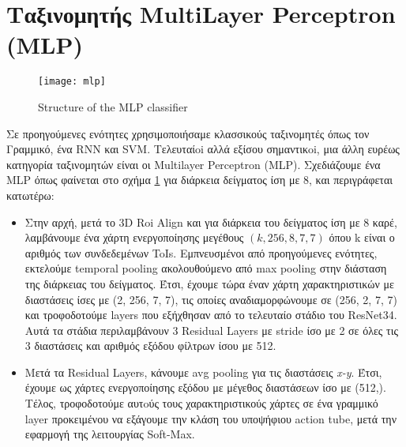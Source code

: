 \section{Ταξινομητής \en MultiLayer Perceptron (MLP)}
\begin{figure}[h]
  \en
  \centering
  \texttt{[image: mlp]}
  \caption{Structure of the MLP classifier}
  \label{fig:gr_mlp_structure}
\end{figure}
\gr
Σε προηγούμενες ενότητες χρησιμοποιήσαμε κλασσικούς ταξινομητές όπως τον Γραμμικό, ένα \en RNN \gr και \en SVM\gr.
Τελευταίoi αλλά εξίσου σημαντικoi, μια άλλη ευρέως κατηγορία ταξινομητών είναι οι \en Multilayer Perceptron (MLP)\gr.
Σχεδιάζουμε ένα MLP όπως φαίνεται στο σχήμα \ref{fig:gr_mlp_structure} για διάρκεια δείγματος ίση με 8, και περιγράφεται κατωτέρω:

\begin{itemize}
\item Στην αρχή, μετά το \en 3D Roi Align \gr και για  διάρκεια του δείγματος ίση με  8 καρέ,
λαμβάνουμε ένα χάρτη ενεργοποίησης μεγέθους  $(k, 256, 8, 7, 7)$ όπου k είναι ο αριθμός των συνδεδεμένων ToIs. Εμπνευσμένοι
από προηγούμενες ενότητες, εκτελούμε \en temporal pooling \gr ακολουθούμενο  από
\en max pooling \gr  στην  διάσταση της διάρκειας του δείγματος. Έτσι, έχουμε τώρα έναν χάρτη χαρακτηριστικών 
με διαστάσεις ίσες με (2, 256, 7, 7), τις οποίες αναδιαμορφώνουμε σε
(256, 2, 7, 7) και τροφοδοτούμε \en layers \gr που εξήχθησαν από το τελευταίο στάδιο του \en ResNet34\gr.
Αυτά τα στάδια περιλαμβάνουν 3 \en Residual Layers \gr  με \en stride \gr  ίσο με 2 σε όλες τις 3
διαστάσεις και αριθμός εξόδου φίλτρων ίσου με 512.
\item Μετά τα \en Residual Layers\gr, κάνουμε \en avg pooling \gr για τις διαστάσεις \en \textit{ x-y}\gr.
Έτσι, έχουμε ως χάρτες ενεργοποίησης εξόδου με μέγεθος διαστάσεων ίσο με (512,).
Τέλος, τροφοδοτούμε  αυτoύς  τους  χαρακτηριστικούς  χάρτες σε ένα γραμμικό \en layer \gr προκειμένου να εξάγουμε την κλάση
του υποψήφιου \en action tube, \gr μετά την εφαρμογή της λειτουργίας \en  Soft-Max\gr.
\end{itemize}

